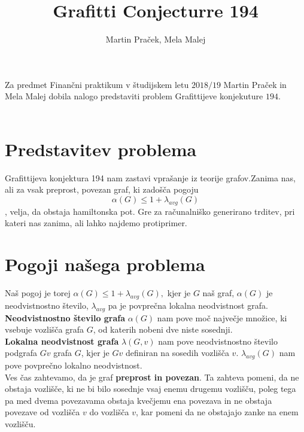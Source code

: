 \documentclass[12pt,a4paper]{amsart}
\begin{document}
\title{Grafitti Conjecturre 194}
\author{Martin Praček, Mela Malej}
\maketitle
Za predmet Finančni praktikum v študijskem letu $2018/19$ Martin Praček in Mela Malej dobila nalogo predstaviti problem Grafittijeve konjekuture $194$. \\\\
\section{Predstavitev problema}
Grafittijeva konjektura 194 nam zastavi vprašanje iz teorije grafov.Zanima nas, ali za vsak preprost, povezan graf, ki zadošča pogoju $$ \alpha(G) \leq 1 + \lambda_{avg}(G)$$, velja, da obstaja hamiltonska pot. Gre za računalniško generirano trditev, pri kateri nas zanima, ali lahko najdemo protiprimer.\\
\section{Pogoji našega problema}
Naš pogoj je torej $ \alpha(G) \leq 1 + \lambda_{avg}(G),$
kjer je $G$ naš graf, $\alpha(G)$ je neodvistnostno število, $\lambda_{avg}$ pa je povprečna lokalna neodvistnost grafa.\\
\textbf{Neodvistnostno število grafa} $\alpha(G)$ nam pove moč največje množice, ki vsebuje  vozlišča grafa $G$, od katerih nobeni dve niste sosednji.\\
\textbf{Lokalna neodvistnost grafa} $\lambda(G, v)$ nam pove neodvistnostno število podgrafa $Gv$ grafa $G$, kjer je $Gv$ definiran na sosedih vozlišča $v$. $\lambda_{avg}(G)$ nam pove povprečno lokalno neodvistnost.\\
Ves čas zahtevamo, da je graf \textbf{preprost in povezan}. Ta zahteva pomeni, da ne obstaja vozlišče, ki ne bi bilo sosednje vsaj enemu drugemu vozlišču, poleg tega pa med dvema povezavama obstaja kvečjemu ena povezava in ne obstaja  povezave od vozlišča $v$ do vozlišča $v$, kar pomeni da ne obstajajo zanke na enem vozlišču.\\
 
\end{document}
